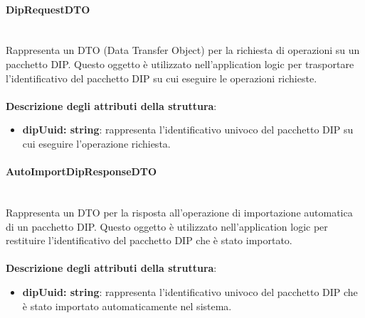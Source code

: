 \documentclass[a4paper,12pt]{article}
\begin{document}
{{{                \paragraph{DipRequestDTO}\label{par:dipRequestDTO}\mbox{}\\
                Rappresenta un DTO (Data Transfer Object) per la richiesta di operazioni su un pacchetto DIP. Questo oggetto è utilizzato nell'application logic per trasportare l'identificativo del pacchetto DIP su cui eseguire le operazioni richieste.\\
                \\
                \textbf{Descrizione degli attributi della struttura}:
                \begin{itemize}
                    \item \textbf{dipUuid: string}: rappresenta l'identificativo univoco del pacchetto DIP su cui eseguire l'operazione richiesta.
                \end{itemize}
                \paragraph{AutoImportDipResponseDTO}\label{par:AutoImportDipResponseDTO}\mbox{}\\
                Rappresenta un DTO per la risposta all'operazione di importazione automatica di un pacchetto DIP. Questo oggetto è utilizzato nell'application logic per restituire l'identificativo del pacchetto DIP che è stato importato.\\
                \\
                \textbf{Descrizione degli attributi della struttura}:
                \begin{itemize}
                    \item \textbf{dipUuid: string}: rappresenta l'identificativo univoco del pacchetto DIP che è stato importato automaticamente nel sistema.
                \end{itemize}
}}}
\end{document}
